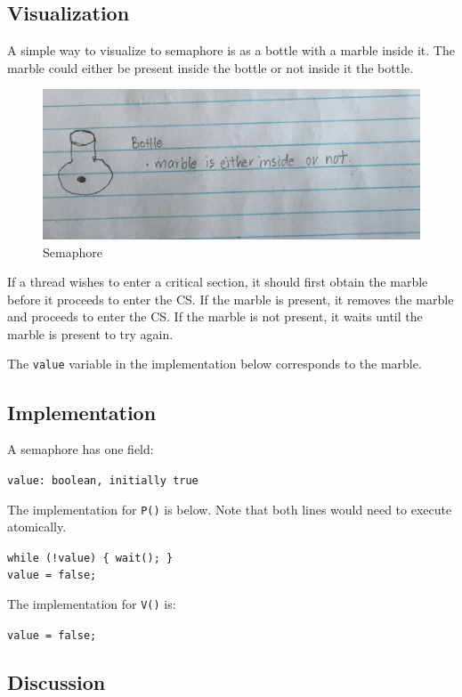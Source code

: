 \documentclass[twoside]{article}
\begin{document}
\subsection{Visualization}

A simple way to visualize to semaphore is as a bottle with a marble inside it. The marble could either be present inside the bottle or not inside it the bottle.

\begin{figure}
  \includegraphics[width=\linewidth]{img/bottle.png}
  \caption{Semaphore}
\end{figure}

If a thread wishes to enter a critical section, it should first obtain the marble before it proceeds to enter the CS.
If the marble is present, it removes the marble and proceeds to enter the CS.
If the marble is not present, it waits until the marble is present to try again.

The {\tt value} variable in the implementation below corresponds to the marble.

\subsection{Implementation}

A semaphore has one field:

{\tt value: boolean, initially true }

The implementation for {\tt P()} is below. Note that both lines would need to execute atomically.

{\tt while (!value) \{ wait(); \}\\
value = false;}

The implementation for {\tt V()} is:

{\tt value = false; }

\subsection{Discussion}
\end{document}
